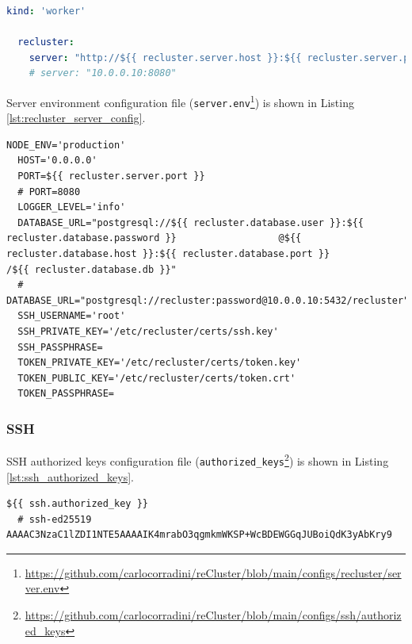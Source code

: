 \begin{lstlisting}[language=yaml, alsoletter={.}, morekeywords={[2]{kind, recluster, server}}, xleftmargin=\parindent, label={lst:recluster_worker_config}, caption=reCluster Worker configuration file]
  kind: 'worker'

  recluster:
    server: "http://${{ recluster.server.host }}:${{ recluster.server.port }}"
    # server: "10.0.0.10:8080"
\end{lstlisting}

Server environment configuration file (\texttt{server.env}\footnote{\url{https://github.com/carlocorradini/reCluster/blob/main/configs/recluster/server.env}})
is shown in Listing \ref{lst:recluster_server_config}.

\begin{lstlisting}[language=shell, alsoletter={_}, morestring={*[b]"}, morekeywords={[4]{NODE_ENV, HOST, PORT, LOGGER_LEVEL, DATABASE_URL, SSH_USERNAME, SSH_PRIVATE_KEY, SSH_PASSPHRASE, TOKEN_PRIVATE_KEY, TOKEN_PUBLIC_KEY, TOKEN_PASSPHRASE}}, xleftmargin=\parindent, label={lst:recluster_server_config}, caption=Server environment configuration file]
  NODE_ENV='production'
  HOST='0.0.0.0'
  PORT=${{ recluster.server.port }}
  # PORT=8080
  LOGGER_LEVEL='info'
  DATABASE_URL="postgresql://${{ recluster.database.user }}:${{ recluster.database.password }}                  @${{ recluster.database.host }}:${{ recluster.database.port }}                                /${{ recluster.database.db }}"
  # DATABASE_URL="postgresql://recluster:password@10.0.0.10:5432/recluster"
  SSH_USERNAME='root'
  SSH_PRIVATE_KEY='/etc/recluster/certs/ssh.key'
  SSH_PASSPHRASE=
  TOKEN_PRIVATE_KEY='/etc/recluster/certs/token.key'
  TOKEN_PUBLIC_KEY='/etc/recluster/certs/token.crt'
  TOKEN_PASSPHRASE=
\end{lstlisting}

\subsubsection{SSH}
\label{subsubsec:implementation_installer_configuration_files_ssh}

SSH authorized keys configuration file (\texttt{authorized\_keys}\footnote{\url{https://github.com/carlocorradini/reCluster/blob/main/configs/ssh/authorized_keys}})
is shown in Listing \ref{lst:ssh_authorized_keys}.

\begin{lstlisting}[language=shell, xleftmargin=\parindent, label={lst:ssh_authorized_keys}, caption=SSH authorized keys file]
  ${{ ssh.authorized_key }}
  # ssh-ed25519 AAAAC3NzaC1lZDI1NTE5AAAAIK4mrabO3qgmkmWKSP+WcBDEWGGqJUBoiQdK3yAbKry9
\end{lstlisting}


